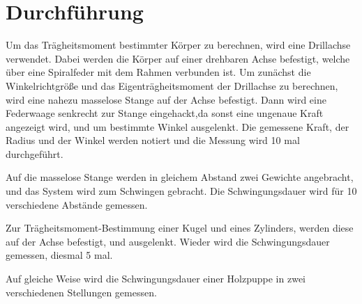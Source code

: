 \section{Durchführung}
\label{sec:Durchführung}

Um das Trägheitsmoment bestimmter Körper zu berechnen, wird eine Drillachse verwendet.
Dabei werden die Körper auf einer drehbaren Achse befestigt, welche über eine Spiralfeder mit dem Rahmen verbunden ist.
Um zunächst die Winkelrichtgröße und das Eigenträgheitsmoment der Drillachse zu berechnen,
wird eine nahezu masselose Stange auf der Achse befestigt. 
Dann wird eine Federwaage senkrecht zur Stange eingehackt,da sonst eine ungenaue Kraft angezeigt wird, und um bestimmte Winkel ausgelenkt.
Die gemessene Kraft, der Radius und der Winkel werden notiert und die Messung wird 10 mal durchgeführt.

Auf die masselose Stange werden in gleichem Abstand zwei Gewichte angebracht, und das System wird zum Schwingen gebracht.
Die Schwingungsdauer wird für 10 verschiedene Abstände gemessen.

Zur Trägheitsmoment-Bestimmung einer Kugel und eines Zylinders, werden diese auf der Achse befestigt, und ausgelenkt.
Wieder wird die Schwingungsdauer gemessen, diesmal 5 mal. 

Auf gleiche Weise wird die Schwingungsdauer einer Holzpuppe in zwei verschiedenen Stellungen gemessen.

